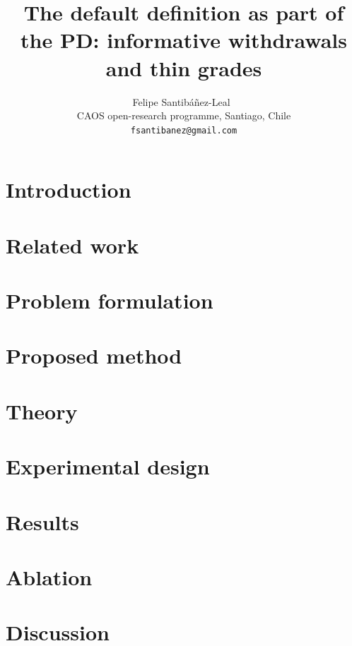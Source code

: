 \documentclass[11pt]{article}
\title{The default definition as part of the PD: informative withdrawals and thin grades}
\author{Felipe Santib\'a\~nez-Leal~\orcidlink{0000-0002-0150-3246}\\
\small CAOS open-research programme, Santiago, Chile\\
\small \texttt{fsantibanez@gmail.com}}
\date{\docdate}
\begin{document}
\maketitle
\headerblock

\begin{abstract}

\end{abstract}

\section{Introduction}
\label{sec:introduction}


\section{Related work}
\label{sec:related-work}


\section{Problem formulation}
\label{sec:problem}


\section{Proposed method}
\label{sec:proposed-method}


\section{Theory}
\label{sec:theory}


\section{Experimental design}
\label{sec:experimental-design}


\section{Results}
\label{sec:results}


\section{Ablation}
\label{sec:ablation}


\section{Discussion}
\label{sec:discussion}

\end{document}
